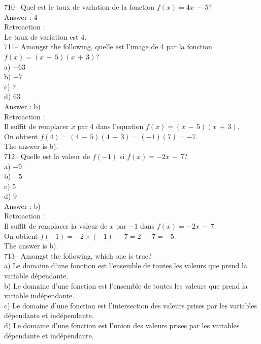 ﻿\documentclass[letterpaper, 12pt]{article}
\begin{document}
710-- Quel est le taux de variation de la fonction $f(x)=4x\,-\,5$?\\

Answer :  4\\

Retroaction :  \\
Le taux de variation est 4.\\

711-- Amongst the following, quelle est l'image de 4 par la
fonction $f(x)=(x\,-\,5)(x\,+\,3)$?\\
a) $-63$\\
b) $-7$\\
c) 7\\
d) 63\\

Answer : b)\\

Retroaction : \\
Il suffit de remplacer $x$ par 4 dans l'equation
$f(x)=(x\,-\,5)(x\,+\,3)$.\\
On obtient $f(4)=(4\,-\,5)(4\,+\,3)=(-1)(7)=-7$.\\
The answer is b).\\

712-- Quelle est la valeur de $f(-1)$ si $f(x)=-2x\,-\,7$?\\
a) $-9$\\
b) $-5$\\
c) 5\\
d) 9\\

Answer : b)\\

Retroaction : \\
Il suffit de remplacer la valeur de $x$ par $-1$ dans $f(x)=-2x\,-\,7$.\\
On obtient $f(-1)=-2\times(-1)\,-\,7=2\,-\,7=-5$.\\
The answer is b).\\

713--  Amongst the following, which one is true?\\
a) Le domaine d'une fonction est l'ensemble de toutes les valeurs que prend
la variable d\'ependante.\\
b) Le domaine d'une fonction est l'ensemble de toutes les valeurs que prend
la variable ind\'ependante.\\
c) Le domaine d'une fonction est l'intersection des valeurs prises par les
variables d\'ependante et ind\'ependante.\\
d) Le domaine d'une fonction est l'union des valeurs prises par les
variables d\'ependante et ind\'ependante.\\
\end{document}
